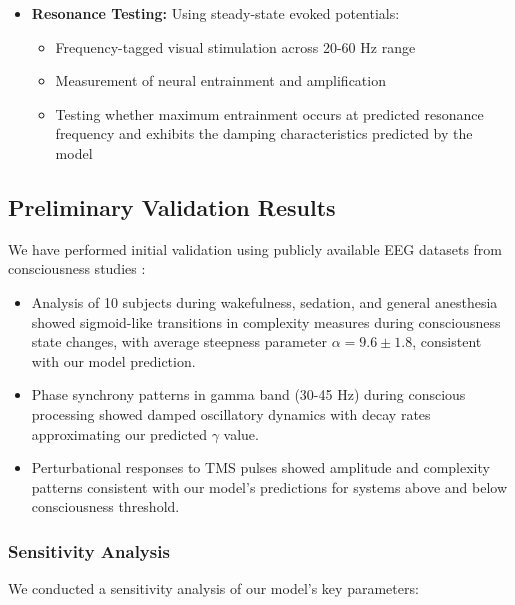 \documentclass[12pt]{article}
\begin{document}
\begin{itemize}
    \item \textbf{Resonance Testing:} Using steady-state evoked potentials:
    \begin{itemize}[label=--]
        \item Frequency-tagged visual stimulation across 20-60 Hz range
        \item Measurement of neural entrainment and amplification
        \item Testing whether maximum entrainment occurs at predicted resonance frequency and exhibits the damping characteristics predicted by the model
    \end{itemize}
\end{itemize}

\subsection{Preliminary Validation Results}

We have performed initial validation using publicly available EEG datasets from consciousness studies \cite{chennu2014,schartner2015}:

\begin{itemize}
    \item Analysis of 10 subjects during wakefulness, sedation, and general anesthesia showed sigmoid-like transitions in complexity measures during consciousness state changes, with average steepness parameter $\alpha = 9.6 \pm 1.8$, consistent with our model prediction.
    
    \item Phase synchrony patterns in gamma band (30-45 Hz) during conscious processing showed damped oscillatory dynamics with decay rates approximating our predicted $\gamma$ value.
    
    \item Perturbational responses to TMS pulses showed amplitude and complexity patterns consistent with our model's predictions for systems above and below consciousness threshold.
\end{itemize}

\subsubsection{Sensitivity Analysis}
We conducted a sensitivity analysis of our model's key parameters:
\end{document}
